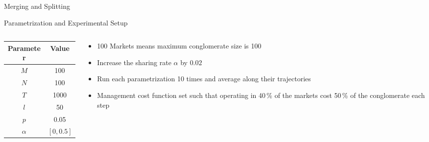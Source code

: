 \documentclass[aspectratio=169]{beamer}
\begin{document}
\begin{frame}{Merging and Splitting}
\end{frame}

\begin{frame}{Parametrization and Experimental Setup}
  \begin{columns}
    \begin{column}{0.5 \textwidth}
      \begin{table}[h]
        \centering
        \begin{tabular}{|c|c|}
          \hline
          \textbf{Parameter} & \textbf{Value} \\
          \hline
          $M$ & 100  \\
          $N$ & 100 \\
          $T$ & 1000 \\
          $l$ & 50 \\
          $p$ & 0.05 \\
          $\alpha$ & $\left[0, 0.5 \right]$ \\
          \hline
        \end{tabular}
      \end{table}
    \end{column}
    \begin{column}{0.5 \textwidth}
      \begin{itemize}
        \item 100 Markets means maximum conglomerate size is 100
        \item Increase the sharing rate $\alpha$ by $0.02$
        \item Run each parametrization 10 times and average along their trajectories
        \item Management cost function set such that operating in 40\,\% of the markets cost 50\,\% of the conglomerate each step
      \end{itemize}
      
    \end{column}
  \end{columns}

  
  
\end{frame}
\end{document}
